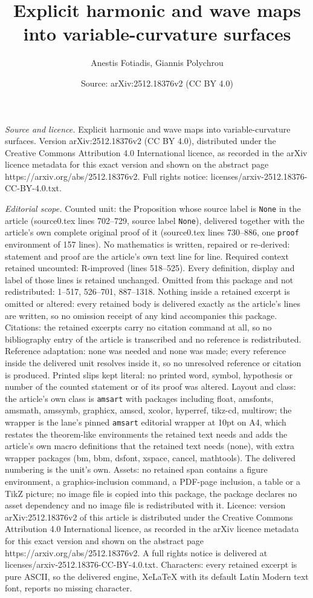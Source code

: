 \documentclass[10pt,a4paper]{amsart}
\title[Explicit harmonic and wave maps into variable-curvature surf]{Explicit harmonic and wave maps into variable-curvature surfaces}
\author{Anestis Fotiadis, Giannis Polychrou}
\date{Source: arXiv:2512.18376v2 (CC BY 4.0)}
\begin{document}
\maketitle

\noindent\emph{Source and licence.} Explicit harmonic and wave maps into variable-curvature surfaces. Version arXiv:2512.18376v2 (CC BY 4.0), distributed under the Creative Commons Attribution 4.0 International licence, as recorded in the arXiv licence metadata for this exact version and shown on the abstract page https://arxiv.org/abs/2512.18376v2. Full rights notice: licenses/arxiv-2512.18376-CC-BY-4.0.txt.\par\smallskip

\noindent\textit{Editorial scope.} Counted unit: the Proposition whose source label is \texttt{None} in the article (source0.tex lines 702--729, source label \texttt{None}), delivered together with the article's own complete original proof of it (source0.tex lines 730--886, one \texttt{proof} environment of 157 lines). No mathematics is written, repaired or re-derived: statement and proof are the article's own text line for line. Required context retained uncounted: R-improved (lines 518--525). Every definition, display and label of those lines is retained unchanged. Omitted from this package and not redistributed: 1--517, 526--701, 887--1318. Nothing inside a retained excerpt is omitted or altered: every retained body is delivered exactly as the article's lines are written, so no omission receipt of any kind accompanies this package. Citations: the retained excerpts carry no citation command at all, so no bibliography entry of the article is transcribed and no reference is redistributed. Reference adaptation: none was needed and none was made; every reference inside the delivered unit resolves inside it, so no unresolved reference or citation is produced. Printed slips kept literal: no printed word, symbol, hypothesis or number of the counted statement or of its proof was altered. Layout and class: the article's own class is \texttt{amsart} with packages including float, amsfonts, amsmath, amssymb, graphicx, amscd, xcolor, hyperref, tikz-cd, multirow; the wrapper is the lane's pinned \texttt{amsart} editorial wrapper at 10pt on A4, which restates the theorem-like environments the retained text needs and adds the article's own macro definitions that the retained text needs (none), with extra wrapper packages (bm, bbm, dsfont, xspace, cancel, mathtools). The delivered numbering is the unit's own. Assets: no retained span contains a figure environment, a graphics-inclusion command, a PDF-page inclusion, a table or a TikZ picture; no image file is copied into this package, the package declares no asset dependency and no image file is redistributed with it. Licence: version arXiv:2512.18376v2 of this article is distributed under the Creative Commons Attribution 4.0 International licence, as recorded in the arXiv licence metadata for this exact version and shown on the abstract page https://arxiv.org/abs/2512.18376v2. A full rights notice is delivered at licenses/arxiv-2512.18376-CC-BY-4.0.txt. Characters: every retained excerpt is pure ASCII, so the delivered engine, XeLaTeX with its default Latin Modern text font, reports no missing character.
\end{document}
